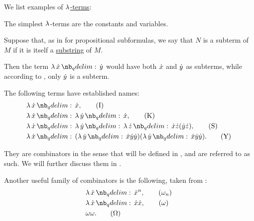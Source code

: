 \begin{example}\label{ex:def:lambda_term}
  We list examples of \hyperref[def:lambda_term]{\( \mathrm{\lambda} \)-terms}:
  \begin{thmenum}
     The simplest \( \mathrm{\lambda} \)-terms are the constants and variables.

     Suppose that, as in  for propositional subformulas, we say that \( N \) is a subterm of \( M \) if it is itself a \hyperref[def:formal_language/substring]{substring} of \( M \).

    Then the term \( \qabs \synx \syny \) would have both \( {\dot{x}} \) and \( {\dot{y}} \) as subterms, while according to , only \( {\dot{y}} \) is a subterm.

     The following terms have established names:
    \begin{align}
      &\qabs \synx \synx, \label{eq:ex:def:lambda_term/combinator/i}\tag{I} \\
      &\qabs \synx \qabs \syny \synx, \label{eq:ex:def:lambda_term/combinator/k}\tag{K} \\
      &\qabs \synx \qabs \syny \qabs \synz \synx \synz (\syny \synz), \label{eq:ex:def:lambda_term/combinator/s}\tag{S} \\
      &\qabs \synx (\qabs \syny \synx \syny \syny) (\qabs \syny \synx \syny \syny). \label{eq:ex:def:lambda_term/combinator/y}\tag{Y}
    \end{align}

    They are combinators in the sense that will be defined in , and are referred to as such. We will further discuss them in .

    Another useful family of combinators is the following, taken from \cite[\S 3.1.21; \S 6.2.1]{Barendregt1984LambdaCalculus}:
    \begin{align}
      &\qabs \synx \synx^n, \label{eq:ex:def:lambda_term/combinator/omega_n}\tag{\ensuremath{ \omega_n }} \\
      &\qabs \synx \synx \synx, \label{eq:ex:def:lambda_term/combinator/omega}\tag{\ensuremath{ \omega }} \\
      &\omega \omega. \label{eq:ex:def:lambda_term/combinator/big_omega}\tag{\ensuremath{ \Omega }}
    \end{align}
  \end{thmenum}
\end{example}

